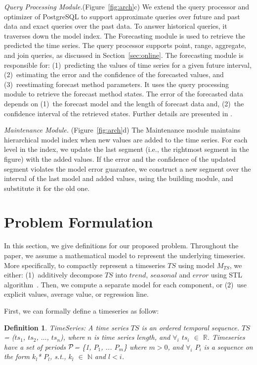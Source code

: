 \documentclass{sigmod}
\newcommand{\LNs}{hierarchical model index }
\newtheorem{mydef}{Definition}
\begin{document}
{\em Query Processing Module.}(Figure~\ref{fig:arch}c) We extend the query processor and optimizer of PostgreSQL to support approximate queries over future and past data and exact queries over the past data. 
To answer historical queries, it traverses down the model index. The Forecasting module is used to retrieve the predicted the time series.
The query processor supports point, range, aggregate, and join queries, as discussed in Section~\ref{sec:online}. 
 The forecasting module is responsible for: (1)~predicting the values of time series for a given future interval, (2)~estimating the error and the confidence of the 
forecasted values, and (3)~reestimating forecast method parameters. It uses the query processing module to retrieve the forecast method states. The error of the forecasted data~\cite{tBOX76a} depends on (1)~the forecast model and the length of forecast data and, (2)~the confidence interval of the retrieved states. Further details are presented in \cite{FRL12}.


{\em Maintenance Module.} (Figure~\ref{fig:arch}d)
The Maintenance module maintains \LNs  when new values are added to the time series.
For each level in the index,  we update the last segment (i.e., the rightmost segment in the figure) with the added values. 
If the error and the confidence of the updated segment violates the model error guarantee, we construct a new segment over the interval of the last model and added values, using the building module, and substitute it for the old one. 




\section{Problem Formulation}
\label{sec:form}
In this section, we give  definitions for our proposed problem. Throughout the paper, we assume a mathematical model to  represent the underlying timeseries. More specifically, to compactly represent a timeseries $TS$ using model  $M_{TS}$, we either: (1)~additively decompose $TS$ into $trend$, $seasonal$ and $error$ using STL algorithm~\cite{STL}. Then, we compute a separate model for each component, or (2)~use explicit values, average  value, or regression line. %

First, we can formally define a timeseries as follow:
\begin{mydef} TimeSeries: A time series $TS$ is an ordered temporal sequence. $TS$= ($ts_1$, $ts_2$, $\dots$, $ts_n$), where $n$ is time series length, and $\forall_i$ $ts_i$ $\in$ $\mathbb{R}$. Timeseries have a set of periods $\cal P$= \{1, $P_1$, ... $P_m$\} where $m > 0$, and $\forall_i$ $P_i$ is a sequence on the form $k_l$* $P_l$, s.t., $k_l$ $\in$ $\mathbb{N}$ and $l<i$.
\end{mydef}
\end{document}
